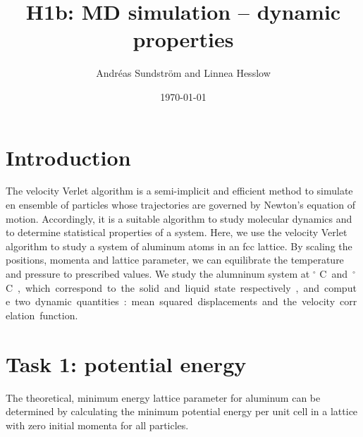 
\usepackage{units}
\usepackage{physics}

\newcommand{\ee}{\mathrm{e}}
\newcommand{\ii}{\mathrm{i}}

\title{H1b: MD simulation -- dynamic properties}
\author{Andr\'eas Sundstr\"om and Linnea Hesslow}
\date{\today}





\section*{Introduction}

The velocity Verlet algorithm is a semi-implicit and efficient method to simulate en ensemble of particles whose trajectories are governed by Newton's equation of motion. Accordingly, 
it is a suitable algorithm to study molecular dynamics and to determine statistical properties of a system. Here, we use the velocity Verlet algorithm to study a system of aluminum atoms in an fcc lattice. By scaling the positions, momenta and lattice parameter, we can equilibrate the temperature and pressure to prescribed values. We  study the alumninum system at \unit[500]{$^\circ$ C} and \unit[700]{$^\circ$ C}, which correspond to the solid and liquid state respectively, and compute two dynamic quantities:   
mean squared displacements and the velocity correlation function. 



\section*{Task 1: potential energy}
The theoretical, minimum energy lattice parameter for aluminum can be determined by calculating the minimum potential energy per unit cell in a lattice with zero initial momenta for all particles. 


